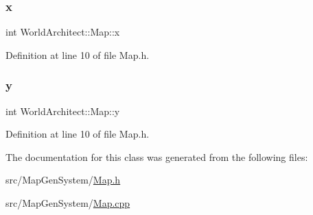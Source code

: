 \subsubsection{\texorpdfstring{x}{x}}
{\footnotesize\ttfamily int World\+Architect\+::\+Map\+::x\hspace{0.3cm}{\ttfamily [protected]}}



Definition at line 10 of file Map.\+h.

\mbox{\label{class_world_architect_1_1_map_abd1e160bb8b03587caac4fb508c13307}} 
\subsubsection{\texorpdfstring{y}{y}}
{\footnotesize\ttfamily int World\+Architect\+::\+Map\+::y\hspace{0.3cm}{\ttfamily [protected]}}



Definition at line 10 of file Map.\+h.



The documentation for this class was generated from the following files\+:\begin{DoxyCompactItemize}
\item 
src/\+Map\+Gen\+System/\mbox{\hyperlink{_map_8h}{Map.\+h}}\item 
src/\+Map\+Gen\+System/\mbox{\hyperlink{_map_8cpp}{Map.\+cpp}}\end{DoxyCompactItemize}
